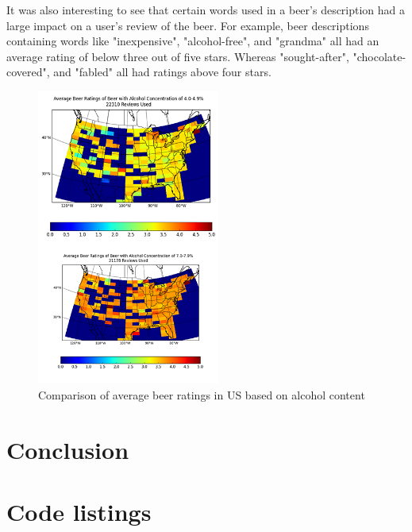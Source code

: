 \documentclass[10pt]{IEEEtran}
\begin{document}
It was also interesting to see that certain words used in a beer's description had a large impact on a user's review of the beer. For example, beer descriptions containing words like "inexpensive", "alcohol-free", and "grandma" all had an average rating of below three out of five stars. Whereas "sought-after", "chocolate-covered", and "fabled" all had ratings above four stars.

\begin{figure}[t]
  \centering
  \includegraphics[width=6cm]{./graphics/abvComp.png}
  \caption{Comparison of average beer ratings in US based on alcohol content}
  \label{fig:abvcomp}
\end{figure}

\section{Conclusion}






\clearpage
\onecolumn
\appendices
\section{Code listings}

\lstlistoflistings

\label{listing:PBA}
\end{document}
